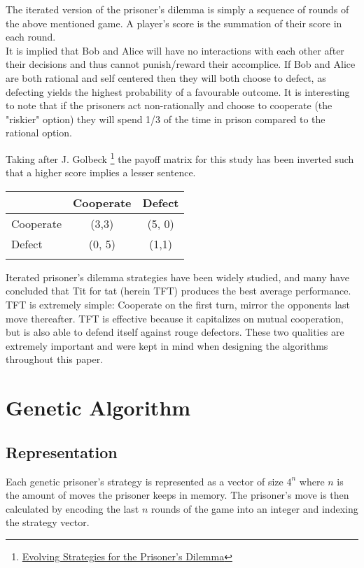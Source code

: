 \documentclass[12pt]{article}
\begin{document}
The iterated version of the prisoner's dilemma is simply a sequence of rounds of
the above mentioned game.  A player's score is the summation of their score in
each round. \\

It is implied that Bob and Alice will have no interactions with each other after
their decisions and thus cannot punish/reward their accomplice. If Bob and Alice are
both rational and self centered then they will both choose to defect, as defecting
yields the highest probability of a favourable outcome.  It is interesting to note
that if the prisoners act non-rationally and choose to cooperate
(the "riskier" option) they will spend 1/3 of the time in prison compared
to the rational option. \\

\pagebreak

Taking after J. Golbeck
\footnote{\href{http://cgis.cs.umd.edu/~golbeck/downloads/JGolbeck\_prison.pdf}
{Evolving Strategies for the Prisoner's Dilemma}}
the payoff matrix for this study has been
inverted such that a higher score implies a lesser sentence. \\

\begin{center}
    \begin{tabular}{l | c | c}
         & Cooperate & Defect \\
        \hline
        Cooperate & (3,3) & (5, 0)\\
        \hline
        Defect & (0, 5) & (1,1) \\ \\
    \end{tabular}
\end{center}

Iterated prisoner's dilemma strategies have been widely studied, and many have
concluded that Tit for tat (herein TFT) produces the best average performance.
TFT is extremely simple: Cooperate on the first turn, mirror the opponents
last move thereafter.  TFT is effective because it capitalizes on mutual
cooperation, but is also able to defend itself against rouge defectors.  These
two qualities are extremely important and were kept in mind when designing the
algorithms throughout this paper.
\clearpage
\pagebreak

\section{Genetic Algorithm}

\subsection{Representation}
Each genetic prisoner's strategy is represented as a vector of size
$4^n$ where $n$ is the amount of moves the prisoner keeps in memory.  The
prisoner's move is then calculated by encoding the last $n$ rounds of the game
into an integer and indexing the strategy vector. \\
\end{document}
